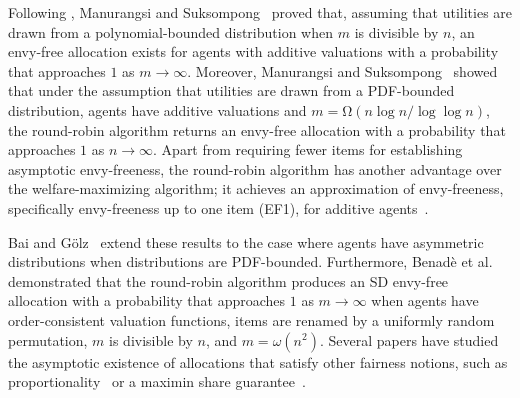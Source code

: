 Following \cite{Dickerson2014}, Manurangsi and Suksompong~\cite{ManurangsiSuksompong2020} proved that, assuming that utilities are drawn from a polynomial-bounded distribution when $m$ is divisible by $n$, an envy-free allocation exists for agents with additive valuations with a probability that approaches $1$ as $m\to\infty$.
%
Moreover, Manurangsi and Suksompong~\cite{ManurangsiSuksompong2021} showed that under the assumption that utilities are drawn from a PDF-bounded distribution, agents have additive valuations and $m=\mathrm{\Omega}(n\log n/\log \log n)$, the round-robin algorithm returns an envy-free allocation with a probability that approaches $1$ as $n\to\infty$. Apart from requiring fewer items for establishing asymptotic envy-freeness, the round-robin algorithm has another advantage over the welfare-maximizing algorithm; it achieves an approximation of envy-freeness, specifically envy-freeness up to one item (EF1), for additive agents~\cite{Caragiannis2019}.

Bai and G\"{o}lz~\cite{BaiGolz2022} extend these results to the case where agents have asymmetric distributions when distributions are PDF-bounded.
Furthermore, Benad\`{e} et al.~\cite{BenadeHalpernPsomasVerma2023} demonstrated that the round-robin algorithm produces an SD envy-free allocation with a probability that approaches $1$ as $m\to\infty$ when agents have order-consistent valuation functions, items are renamed by a uniformly random permutation, $m$ is divisible by $n$, and $m=\omega(n^2)$.
Several papers have studied the asymptotic existence of allocations that satisfy other fairness notions, such as proportionality~\cite{Suksompong2016} or a maximin share guarantee~\cite{Amanatidis2017,Kurokawa2016}. 



